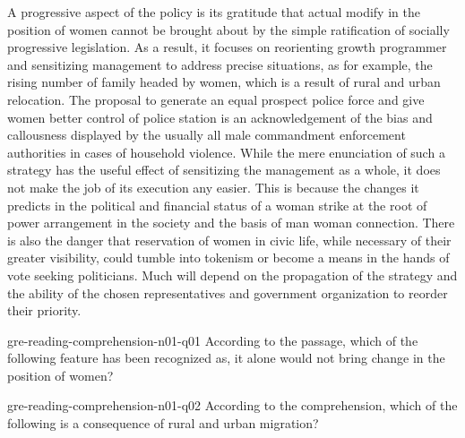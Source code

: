 {\begin{figure*}[p]
    A progressive aspect of the policy is its gratitude that actual modify in the position of women cannot be brought about by the simple ratification of socially progressive legislation. 
    As a result, it focuses on reorienting growth programmer and sensitizing management to address precise situations, as for example, the rising number of family headed by women, which is a result of rural and urban relocation. 
    The proposal to generate an equal prospect police force and give women better control of police station is an acknowledgement of the bias and callousness displayed by the usually all male commandment enforcement authorities in cases of household violence. 
    While the mere enunciation of such a strategy has the useful effect of sensitizing the management as a whole, it does not make the job of its execution any easier. 
    This is because the changes it predicts in the political and financial status of a woman strike at the root of power arrangement in the society and the basis of man woman connection. 
    There is also the danger that reservation of women in civic life, while necessary of their greater visibility, could tumble into tokenism or become a means in the hands of vote seeking politicians. 
    Much will depend on the propagation of the strategy and the ability of the chosen representatives and government organization to reorder their priority.
\end{figure*}


\begin{question}{gre-reading-comprehension-n01-q01}
    According to the passage, which of the following feature has been recognized as, it alone would not bring change in the position of women?
    \begin{choices}
    \end{choices}
\end{question}

\begin{question}{gre-reading-comprehension-n01-q02}
    According to the comprehension, which of the following is a consequence of rural and urban migration?
    \begin{choices}[o]
    \end{choices}
\end{question}

}
